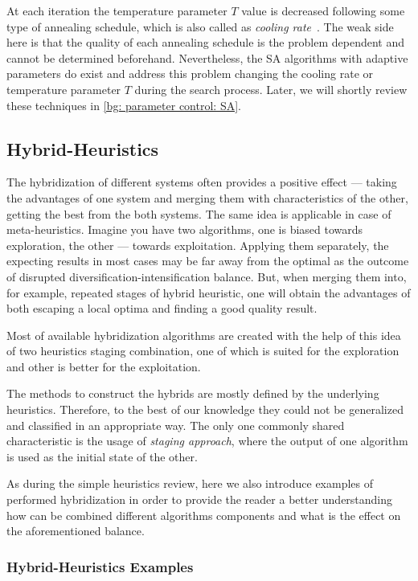At each iteration the temperature parameter $T$ value is decreased following some type of annealing schedule, which is also called as \textit{cooling rate}~\cite{boussaid2013survey}. The weak side here is that the quality of each annealing schedule is the problem dependent and cannot be determined beforehand. Nevertheless, the SA algorithms with adaptive parameters do exist and address this problem changing the cooling rate or temperature parameter $T$ during the search process. Later, we will shortly review these techniques in \cref{bg: parameter control: SA}.


\subsection{Hybrid-Heuristics}
The hybridization of different systems often provides a positive effect — taking the advantages of one system and merging them with characteristics of the other, getting the best from the both systems. The same idea is applicable in case of meta-heuristics. Imagine you have two algorithms, one is biased towards exploration, the other — towards exploitation. Applying them separately, the expecting results in most cases may be far away from the optimal as the outcome of disrupted diversification-intensification balance. But, when merging them into, for example, repeated stages of hybrid heuristic, one will obtain the advantages of both escaping a local optima and finding a good quality result. 

Most of available hybridization algorithms are created with the help of this idea of two heuristics staging combination, one of which is suited for the exploration and other is better for the exploitation.

The methods to construct the hybrids are mostly defined by the underlying heuristics. Therefore, to the best of our knowledge they could not be generalized and classified in an appropriate way. The only one commonly shared characteristic is the usage of \textit{staging approach}, where the output of one algorithm is used as the initial state of the other. 

As during the simple heuristics review, here we also introduce examples of performed hybridization in order to provide the reader a better understanding how can be combined different algorithms components and what is the effect on the aforementioned balance.

\subsubsection{Hybrid-Heuristics Examples}

